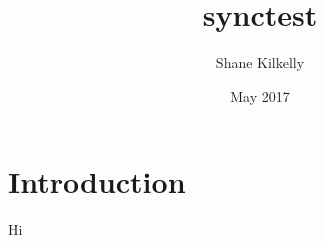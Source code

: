 \documentclass{article}
\title{synctest}
\author{Shane Kilkelly}
\date{May 2017}
\begin{document}
\maketitle

\section{Introduction}


Hi
\end{document}
